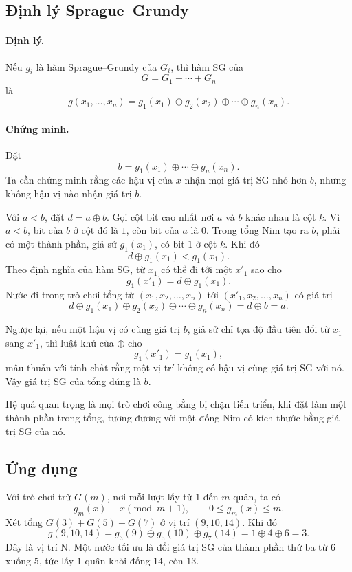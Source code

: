 \documentclass[11pt]{article}
\newcommand{\xor}{\mathbin{\oplus}}
\begin{document}
\subsection{Định lý Sprague--Grundy}

\paragraph{Định lý.}
Nếu \(g_i\) là hàm Sprague--Grundy của \(G_i\), thì hàm SG của
\[
  G=G_1+\cdots+G_n
\]
là
\[
  g(x_1,\ldots,x_n)=g_1(x_1)\xor g_2(x_2)\xor\cdots\xor g_n(x_n).
\]

\paragraph{Chứng minh.}
Đặt
\[
  b=g_1(x_1)\xor\cdots\xor g_n(x_n).
\]
Ta cần chứng minh rằng các hậu vị của \(x\) nhận mọi giá trị SG nhỏ hơn \(b\),
nhưng không hậu vị nào nhận giá trị \(b\).

Với \(a<b\), đặt \(d=a\xor b\). Gọi cột bit cao nhất nơi \(a\) và \(b\) khác
nhau là cột \(k\). Vì \(a<b\), bit của \(b\) ở cột đó là \(1\), còn bit của
\(a\) là \(0\). Trong tổng Nim tạo ra \(b\), phải có một thành phần, giả sử
\(g_1(x_1)\), có bit \(1\) ở cột \(k\). Khi đó
\[
  d\xor g_1(x_1)<g_1(x_1).
\]
Theo định nghĩa của hàm SG, từ \(x_1\) có thể đi tới một \(x'_1\) sao cho
\[
  g_1(x'_1)=d\xor g_1(x_1).
\]
Nước đi trong trò chơi tổng từ \((x_1,x_2,\ldots,x_n)\) tới
\((x'_1,x_2,\ldots,x_n)\) có giá trị
\[
  d\xor g_1(x_1)\xor g_2(x_2)\xor\cdots\xor g_n(x_n)=d\xor b=a.
\]

Ngược lại, nếu một hậu vị có cùng giá trị \(b\), giả sử chỉ tọa độ đầu tiên
đổi từ \(x_1\) sang \(x'_1\), thì luật khử của \(\xor\) cho
\[
  g_1(x'_1)=g_1(x_1),
\]
mâu thuẫn với tính chất rằng một vị trí không có hậu vị cùng giá trị SG với
nó. Vậy giá trị SG của tổng đúng là \(b\).

Hệ quả quan trọng là mọi trò chơi công bằng bị chặn tiến triển, khi đặt làm
một thành phần trong tổng, tương đương với một đống Nim có kích thước bằng giá
trị SG của nó.

\subsection{Ứng dụng}

Với trò chơi trừ \(G(m)\), nơi mỗi lượt lấy từ \(1\) đến \(m\) quân, ta có
\[
  g_m(x)\equiv x\pmod{m+1},\qquad 0\le g_m(x)\le m.
\]
Xét tổng \(G(3)+G(5)+G(7)\) ở vị trí \((9,10,14)\). Khi đó
\[
  g(9,10,14)=g_3(9)\xor g_5(10)\xor g_7(14)
  =1\xor4\xor6=3.
\]
Đây là vị trí N. Một nước tối ưu là đổi giá trị SG của thành phần thứ ba từ
\(6\) xuống \(5\), tức lấy \(1\) quân khỏi đống \(14\), còn \(13\).
\end{document}
